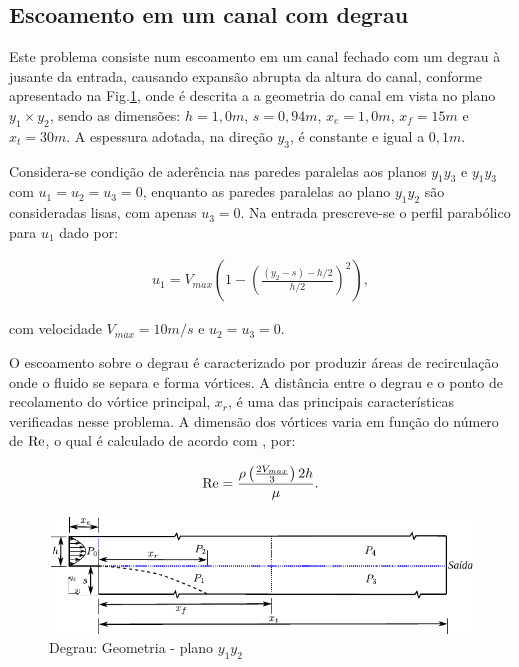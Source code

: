 \documentclass[tese_patricia]{subfiles}
\begin{document}
\subsection {Escoamento em um canal com degrau}

Este problema consiste num escoamento em um canal fechado com um degrau à jusante da entrada, causando expansão abrupta da altura do canal, conforme apresentado na Fig.\ref{fig:degrau_geometria}, onde é descrita a a geometria do canal em vista no plano $y_1\times y_2$, sendo as dimensões: $h = 1,0m$, $s = 0,94m$, $x_{e}= 1,0m$, $x_{f}= 15m$ e $x_{t} = 30m$. A espessura adotada, na direção $y_3$, é constante e igual a $0,1m$.  

Considera-se condição de aderência nas paredes paralelas aos planos $y_1$$y_3$ e $y_1$$y_3$ com $u_1=u_2=u_3=0$, enquanto as paredes paralelas ao plano $y_1$$y_2$ são consideradas lisas, com apenas $u_3=0$. Na entrada prescreve-se o perfil parabólico para $u_1$ dado por:

\begin{align}
u_{1} = V_{max} \left(1-\left(\frac{\left(y_2-s\right)-h/2}{h/2}\right)^{2}\right),
\end{align}

\noindent com velocidade $V_{max} = 10 m/s$ e $u_{2} = u_{3} = 0$.

O escoamento sobre o degrau é caracterizado por produzir áreas de recirculação onde o fluido se separa e forma vórtices. A distância entre o degrau e o ponto de recolamento do vórtice principal, $x_{r}$, é uma das principais características verificadas nesse problema. A dimensão dos vórtices varia em função do número de $\mathrm{Re}$, o qual é calculado de acordo com , por:

\begin{align}
\mathrm{Re} =\frac{\rho\left(\frac{2V_{max}}{3}\right)2h}{\mu}.
\end{align}

\begin{figure}[htb!]
	\centering
	\includegraphics[scale=1.2,trim=0cm 0cm 0cm 0cm, clip=true]{Imagens/Cap3/degrau_geometria.pdf}
	\caption{Degrau: Geometria - plano $y_1$$y_2$}
	\label{fig:degrau_geometria}
\end{figure}
\end{document}
